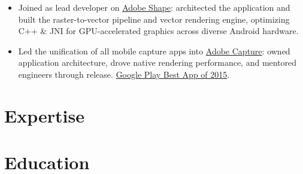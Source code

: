 \documentclass[11pt,letterpaper,sans]{resume}
\begin{document}
\begin{itemize}
\item Joined as lead developer on \href{https://play.google.com/store/apps/details?id=com.adobe.creativeapps.shape}{Adobe Shape}: architected the application and built the raster-to-vector pipeline and vector rendering engine, optimizing C++ \& JNI for GPU-accelerated graphics across diverse Android hardware.
\item Led the unification of all mobile capture apps into \href{https://play.google.com/store/apps/details?id=com.adobe.creativeapps.gather}{Adobe Capture}: owned application architecture, drove native rendering performance, and mentored engineers through release. \href{https://blog.adobe.com/en/publish/2015/12/09/google-play-names-adobe-capture-cc-and-adobe-photoshop-lightroom-best-apps-of-2015}{Google Play Best App of 2015}.
\end{itemize}

\earlierheader
{}


\section[E2DC]{Expertise}

\section[E62C]{Education}
\end{document}
